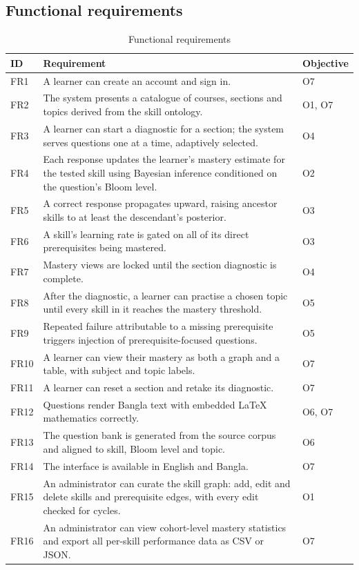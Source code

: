 \subsection{Functional requirements}

\begin{table}[htbp]
  \centering
  \caption{Functional requirements}
  \label{tab:functional}
  \begin{tabularx}{\textwidth}{l>{\hsize}Y>{\hsize}Y}
    \toprule
    ID & Requirement & Objective \\
    \midrule
    FR1 & A learner can create an account and sign in. & O7 \\
    FR2 & The system presents a catalogue of courses, sections and topics derived from the skill ontology. & O1, O7 \\
    FR3 & A learner can start a diagnostic for a section; the system serves questions one at a time, adaptively selected. & O4 \\
    FR4 & Each response updates the learner's mastery estimate for the tested skill using Bayesian inference conditioned on the question's Bloom level. & O2 \\
    FR5 & A correct response propagates upward, raising ancestor skills to at least the descendant's posterior. & O3 \\
    FR6 & A skill's learning rate is gated on all of its direct prerequisites being mastered. & O3 \\
    FR7 & Mastery views are locked until the section diagnostic is complete. & O4 \\
    FR8 & After the diagnostic, a learner can practise a chosen topic until every skill in it reaches the mastery threshold. & O5 \\
    FR9 & Repeated failure attributable to a missing prerequisite triggers injection of prerequisite-focused questions. & O5 \\
    FR10 & A learner can view their mastery as both a graph and a table, with subject and topic labels. & O7 \\
    FR11 & A learner can reset a section and retake its diagnostic. & O7 \\
    FR12 & Questions render Bangla text with embedded \LaTeX{} mathematics correctly. & O6, O7 \\
    FR13 & The question bank is generated from the source corpus and aligned to skill, Bloom level and topic. & O6 \\
    FR14 & The interface is available in English and Bangla. & O7 \\
    FR15 & An administrator can curate the skill graph: add, edit and delete skills and prerequisite edges, with every edit checked for cycles. & O1 \\
    FR16 & An administrator can view cohort-level mastery statistics and export all per-skill performance data as CSV or JSON. & O7 \\
    \bottomrule
  \end{tabularx}
\end{table}

